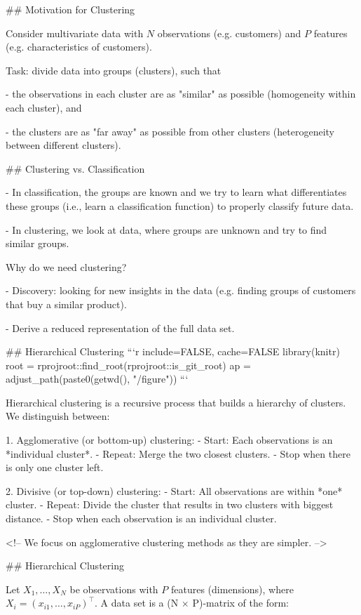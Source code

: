 ## Motivation for Clustering

Consider multivariate data with $N$ observations (e.g. customers) and $P$
features (e.g. characteristics of customers).

Task: divide data into groups (clusters), such that

- the observations in each cluster are as "similar" as possible (homogeneity
  within each cluster), and

- the clusters are as "far away" as possible from other clusters (heterogeneity
  between different clusters).

## Clustering vs. Classification

- In classification, the groups are known and we try to learn what
  differentiates these groups (i.e., learn a classification function) to
  properly classify future data.

- In clustering, we look at data, where groups are unknown and try to find
  similar groups.

Why do we need clustering?

- Discovery: looking for new insights in the data (e.g. finding groups of customers that buy a similar product).

- Derive a reduced representation of the full data set.


## Hierarchical Clustering
```{r include=FALSE, cache=FALSE}
library(knitr)
root = rprojroot::find_root(rprojroot::is_git_root)
ap = adjust_path(paste0(getwd(), "/figure"))
```

Hierarchical clustering is a recursive process that builds a hierarchy of clusters.
We distinguish between:

1. Agglomerative (or bottom-up) clustering:
    - Start: Each observations is an *individual cluster*.
    - Repeat: Merge the two closest clusters.
    - Stop when there is only one cluster left.

2. Divisive (or top-down) clustering:
    - Start: All observations are within *one* cluster.
    - Repeat: Divide the cluster that results in two clusters with biggest distance.
    - Stop when each observation is an individual cluster.

<!-- We focus on agglomerative clustering methods as they are simpler. -->

## Hierarchical Clustering

Let $X_1,\hdots , X_N$ be observations with $P$ features (dimensions), where
$X_i = (x_{i1}, \ldots, x_{iP})^\top$. A data set is a (N $\times$ P)-matrix of
the form:

